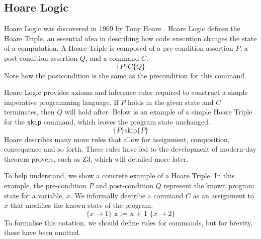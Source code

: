 \subsection{Hoare Logic}
Hoare Logic was discovered in 1969 by Tony Hoare \cite{hoare_logic}. Hoare Logic defines the Hoare Triple, an essential idea in describing how code execution changes the state of a computation. A Hoare Triple is composed of a pre-condition assertion $P$, a post-condition assertion $Q$, and a command $C$.
\[
\{P\} C \{Q\}
\]
Note how the postcondition is the same as the precondition for this command.
\par
Hoare Logic provides axioms and inference rules required to construct a simple imperative programming language. If $P$ holds in the given state and $C$ terminates, then $Q$ will hold after. Below is an example of a simple Hoare Triple for the \texttt{skip} command, which leaves the program state unchanged.
\[
\{P\} \text{skip} \{P\}
\]
Hoare describes many more rules that allow for assignment, composition, consequence and so forth. These rules have led to the development of modern-day theorem provers, such as Z3, which will detailed more later.
\par
To help understand, we show a concrete example of a Hoare Triple. In this example, the pre-condition $P$ and post-condition $Q$ represent the known program state for a variable, $x$. We informally describe a command $C$ as an assignment to $x$ that modifies the known state of the program.
\[
\{ x \rightarrow 1 \} \text{ x := x + 1 } \{ x \rightarrow 2 \}
\]
To formalise this notation, we should define rules for commands, but for brevity, these have been omitted.

